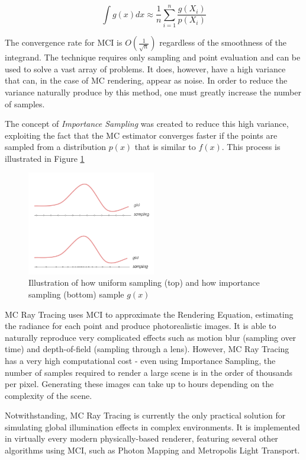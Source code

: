 $$ \int g(x)dx \approx \frac{1}{n} \sum_{i = 1}^{n} \frac{g(X_i)}{p(X_i)}$$

The convergence rate for MCI is $O(\frac{1}{\sqrt{n}})$ regardless of the smoothness of the integrand. The technique requires only sampling and point evaluation and can be used to solve a vast array of problems. It does, however, have a high variance that can, in the case of MC rendering, appear as noise. In order to reduce the variance naturally produce by this method, one must greatly increase the number of samples.

The concept of \textit{Importance Sampling} was created to reduce this high variance, exploiting the fact that the MC estimator converges faster if the points are sampled from a distribution $p(x)$ that is similar to $f(x)$. This process is illustrated in Figure \ref{fig:importance}

\begin{figure}[h]
  \centering
  \includegraphics[width=0.5\textwidth,height=\textheight,keepaspectratio]{images/3_theoretical_foundations/importances.png}
  \caption{Illustration of how uniform sampling (top) and how importance sampling (bottom) sample $g(x)$}
  \label{fig:importance}
\end{figure}

MC Ray Tracing uses MCI to approximate the Rendering Equation, estimating the radiance for each point and produce photorealistic images. It is able to naturally reproduce very complicated effects such as motion blur (sampling over time) and depth-of-field (sampling through a lens). However, MC Ray Tracing has a very high computational cost - even using Importance Sampling, the number of samples required to render a large scene is in the order of thousands per pixel. Generating these images can take up to hours depending on the complexity of the scene. 

Notwithstanding, MC Ray Tracing is currently the only practical solution for simulating global illumination effects in complex environments. It is implemented in virtually every modern physically-based renderer, featuring several other algorithms using MCI, such as Photon Mapping and Metropolis Light Transport.